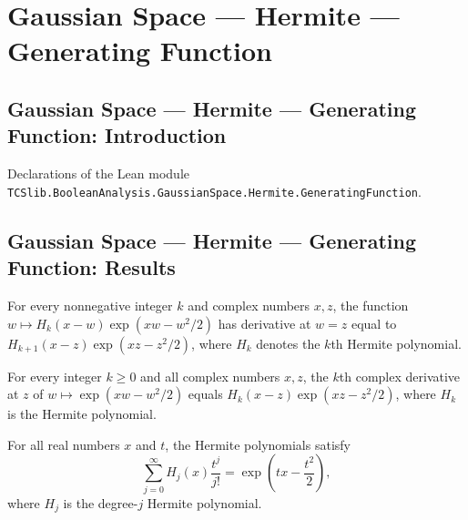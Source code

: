 \section{Gaussian Space --- Hermite --- Generating Function}
\subsection*{Gaussian Space --- Hermite --- Generating Function: Introduction}

Declarations of the Lean module \texttt{TCSlib.BooleanAnalysis.GaussianSpace.Hermite.GeneratingFunction}.

\subsection*{Gaussian Space --- Hermite --- Generating Function: Results}

\begin{lemma}
\label{BooleanAnalysis.GaussianSpace.hasDerivAt_hermite_mul_exp_quadratic}
\leanok
{}
For every nonnegative integer $k$ and complex numbers $x,z$, the function $w\mapsto
H_k(x-w)\exp(xw-w^2/2)$ has derivative at $w=z$ equal to $H_{k+1}(x-z)\exp(xz-z^2/2)$,
where $H_k$ denotes the $k$th Hermite polynomial.
\end{lemma}

\begin{lemma}
\label{BooleanAnalysis.GaussianSpace.iteratedDeriv_exp_quadratic}
\leanok
{}
For every integer $k\ge 0$ and all complex numbers $x,z$, the $k$th complex derivative
at $z$ of $w\mapsto\exp(xw-w^2/2)$ equals $H_k(x-z)\exp(xz-z^2/2)$, where $H_k$ is the
Hermite polynomial.
\end{lemma}

\begin{theorem}
\label{BooleanAnalysis.GaussianSpace.hermite_generating_function}
\leanok
{}
For all real numbers $x$ and $t$, the Hermite polynomials satisfy
\[
\sum_{j=0}^{\infty} H_j(x)\frac{t^j}{j!}=\exp\!\left(tx-\frac{t^2}{2}\right),
\]
where $H_j$ is the degree-$j$ Hermite polynomial.
\end{theorem}

